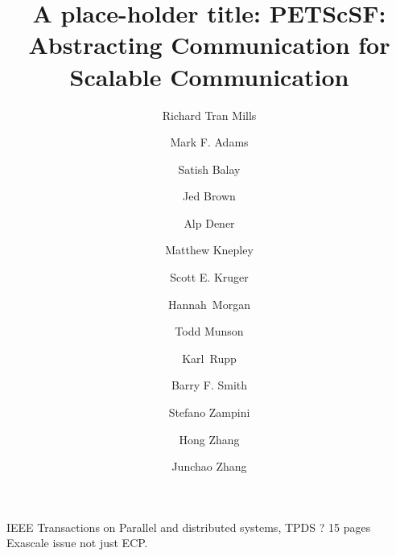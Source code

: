 \documentclass[5p,times]{elsarticle}
\newif\ifargonnereport
\begin{document}
\ifargonnereport

\fi

\begin{frontmatter}

IEEE Transactions on Parallel and distributed systems, TPDS ? 15 pages Exascale issue not just ECP.


\title{A place-holder title:  PETScSF: Abstracting Communication for Scalable Communication}

\author[argonne-address]{Richard Tran Mills } %

\author[lbnl-address]{Mark F. Adams}
\author[argonne-address]{Satish Balay}
\author[cu-address]{Jed Brown}
\author[argonne-address]{Alp Dener}
\author[buffalo-address]{Matthew Knepley}
\author[techx-address]{Scott E. Kruger}
\author[uchicago-address]{Hannah~Morgan}
\author[argonne-address]{Todd Munson}
\author[argonne-address,tuwien-address]{Karl~Rupp}
\author[argonne-associate-address]{Barry F. Smith}
\author[kaust-address]{Stefano Zampini}
\author[argonne-address]{Hong Zhang}
\author[argonne-address]{Junchao Zhang}

\address[argonne-address]{Argonne National Laboratory, 9700 S. Cass Avenue, Lemont, IL 60439 US}
\address[buffalo-address]{University at Buffalo, Buffalo, NY 14260 USA}
\address[lbnl-address]{Lawrence Berkeley National Laboratory, Berkeley, CA 94720 USA}
\address[uchicago-address]{University of Chicago, Chicago, IL 60637 USA}
\address[cu-address]{University of Colorado Boulder, Boulder, CO 80302 USA}
\address[techx-address]{5260 Arapahoe Ave. Suite, A, Boulder, CO 80303 USA}
\address[tuwien-address]{Institute for Microelectronics, TU Wien, Gusshausstrasse 27-29/E360, A-1040 Wien}
\address[argonne-associate-address]{Argonne Associate of Global Empire, LLC, Argonne National Laboratory, 9700 S. Cass Avenue, Lemont, IL 60439 USA }
\address[kaust-address]{King Abdullah University of Science and Technology, Extreme Computing Research Center, Thuwal, Saudi Arabia}


\end{frontmatter}
\end{document}
